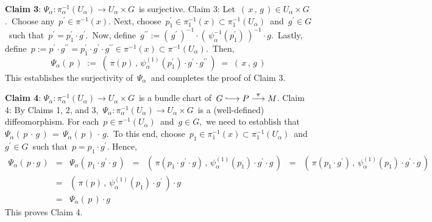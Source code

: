 \vskip 0.5cm
\noindent
\textbf{Claim 3}:\quad
$\Psi_{\alpha} : \pi_{\alpha}^{-1}(U_{\alpha}) \longrightarrow U_{\alpha} \times G$\, is surjective.
\vskip 0.2cm
\proofof Claim 3:\quad
Let \,$(\,x\,,\,g\,) \in U_{\alpha} \times G$.\,
Choose any \,$p^{\prime} \in \pi^{-1}(x)$.
Next, choose \,$p_{1}^{\prime} \in \pi_{1}^{-1}(x) \subset \pi_{1}^{-1}(U_{\alpha})$\, and \,$g^{\prime} \in G$\,
such that \,$p^{\prime} = p_{1}^{\prime} \cdot g^{\prime}$.\,
Now, define \,$g^{\prime\prime} := \left(\,g^{\prime}\,\right)^{-1} \cdot \left(\,\psi_{\alpha}^{-1}(p_{1}^{\prime})\,\right)^{-1} \cdot g$.\,
Lastly, define
\,$p := p^{\prime}\cdot g^{\prime\prime} = p_{1}^{\prime}\cdot g^{\prime} \cdot g^{\prime\prime} \in \pi^{-1}(x) \subset \pi^{-1}(U_{\alpha})$.\,
Then,
\begin{equation*}
\Psi_{\alpha}\!\left(\,p\,\right)
\; := \;
	\left(\,\pi(p)\,,\,\psi_{\alpha}^{(1)}(p_{1}^{\prime}) \cdot g^{\prime} \cdot g^{\prime\prime} \,\right)
\; = \;
	\left(\,x\,,\,g\,\right)
\end{equation*}
This establishes the surjectivity of \,$\Psi_{\alpha}$\, and completes the proof of Claim 3.

\vskip 0.5cm
\noindent
\textbf{Claim 4}:\quad
$\Psi_{\alpha} : \pi_{\alpha}^{-1}(U_{\alpha}) \longrightarrow U_{\alpha} \times G$\, is a bundle chart of
\,$G \longhookrightarrow P \overset{\pi}{\longrightarrow} M$.
\vskip 0.2cm
\proofof Claim 4:\quad
By Claims 1, 2, and 3,
\,$\Psi_{\alpha} : \pi_{\alpha}^{-1}(U_{\alpha}) \longrightarrow U_{\alpha} \times G$\,
is a (well-defined) diffeomorphism.
For each \,$p \in \pi^{-1}(U_{\alpha})$\, and \,$g \in G$,\,
we need to establish that
\,$\Psi_{\alpha}(\,p\,\cdot\,g\,) \, = \, \Psi_{\alpha}(\,p\,)\,\cdot\,g$.\,
To this end, choose \,$p_{1} \in \pi_{1}^{-1}(x) \subset \pi_{1}^{-1}(U_{\alpha})$\,
and \,$g^{\prime} \in G$\, such that \,$p = p_{1} \cdot g^{\prime}$.
Hence,
\begin{eqnarray*}
\Psi_{\alpha}(\,p \cdot g\,)
& = &
	\Psi_{\alpha}(\,p_{1} \cdot g^{\prime} \cdot g\,)
\;\; = \;\;
	\left(\,\pi(p_{1} \cdot g^{\prime} \cdot g)\,,\,\psi_{\alpha}^{(1)}(p_{1}) \cdot g^{\prime} \cdot g\,\right)
\;\; = \;\;
	\left(\,\pi(p_{1} \cdot g^{\prime})\,,\,\psi_{\alpha}^{(1)}(p_{1}) \cdot g^{\prime} \cdot g\,\right)
\\
& = &
	\left(\,\pi(p)\,,\,\psi_{\alpha}^{(1)}(p_{1}) \cdot g^{\prime}\,\right) \cdot g
\\
& = &
	\Psi_{\alpha}(\,p\,) \cdot g
\end{eqnarray*}
This proves Claim 4.

